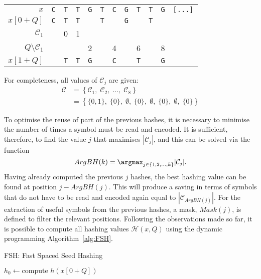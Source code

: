 \begin{example}
	\begin{center}
		\begin{tabular}{r || ccccccccccc}
			$x$ & \texttt{C} & \texttt{T} & \texttt{T} & \texttt{G} & \texttt{T} & \texttt{C} & \texttt{G} & \texttt{T} & \texttt{T} & \texttt{G} & \texttt{[...]} \\
			$x[0 + Q]$ & \texttt{C} & \texttt{T} & \texttt{T} & & \texttt{T} & & \texttt{G} & & \texttt{T} & & \\
			$\mathcal{C}_1$ & & 0 & 1 & & & & & \\
			$Q \setminus \mathcal{C}_1$ & & & & 2 & & 4 & & 6 & & 8 \\
			$x[1 + Q]$ & & \texttt{T} & \texttt{T} & \texttt{G} & & \texttt{C} & & \texttt{T} & & \texttt{G} \\
		\end{tabular}
	\end{center}
	
	For completeness, all values of $\mathcal{C}_j$ are given:\begin{align*}
		\mathcal{C} &= \left\{ \mathcal{C}_1,\; \mathcal{C}_2,\; \dots,\; \mathcal{C}_8 \right\} \\
		&= \left\{ \{0, 1\},\; \{0\},\; \emptyset,\; \{0\},\; \emptyset,\; \{0\},\; \emptyset,\; \{0\} \right\}
	\end{align*}
\end{example}

To optimise the reuse of part of the previous hashes, it is necessary to minimise the number of times a symbol must be read and encoded. It is sufficient, therefore, to find the value $j$ that maximises $|\mathcal{C}_j|$, and this can be solved via the function \[ ArgBH(k) = \argmax_{j \in \{ 1, 2, \dots, k \}} |\mathcal{C}_j|. \] Having already computed the previous $j$ hashes, the best hashing value can be found at position $j - ArgBH(j)$. This will produce a saving in terms of symbols that do not have to be read and encoded again equal to $|\mathcal{C}_{ArgBH(j)}|$. For the extraction of useful symbols from the previous hashes, a mask, $Mask(j)$, is defined to filter the relevant positions. Following the observations made so far, it is possible to compute all hashing values $\mathcal{H}(x, Q)$ using the dynamic programming Algorithm~\ref{alg:FSH}.

\begin{algorithm}[!ht]
	\caption{FSH: Fast Spaced Seed Hashing}
	\label{alg:FSH}
	$h_0 \gets \text{compute } h(x[0 + Q])$\;
\end{algorithm}

